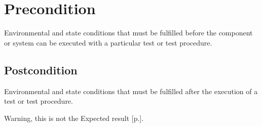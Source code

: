 \section{Precondition}
\label{sec:Precondition}

Environmental and state conditions that must be fulfilled before the component or system can be executed with a particular test or test procedure.

\subsection{Postcondition}
\label{sec:Postcondition}

Environmental and state conditions that must be fulfilled after the execution of a test or test procedure.

Warning, this is not the Expected result [p.\pageref{sec:Actual Result}].

